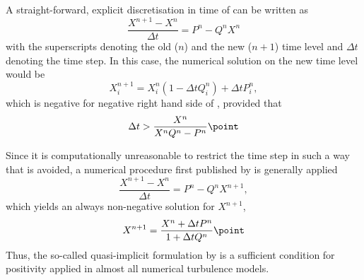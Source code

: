 A straight-forward, explicit discretisation in time of 
can be written as
\begin{equation}
  \label{eq:burchard12}
  \frac{X^{n+1}-X^n}{\Delta t}=P^n-Q^nX^n
\end{equation}
with the superscripts denoting the old ($n$) and the new ($n+1$) time
level and $\Delta t$ denoting the time step.  In this case, the
numerical solution on the new time level would be
\begin{equation}
  \label{eq:burchard13}
  X^{n+1}_i= X^n_i(1-\Delta tQ^n_i)+\Delta t P_i^n
  \comma
\end{equation}
which is negative for negative right hand side of ,
provided that
\begin{equation}
  \label{eq:burchard14}
  \Delta t > \frac{X^n}{X^nQ^n-P^n}
  \point
\end{equation}

Since it is computationally unreasonable to restrict the time step in
such a way that  is avoided, a numerical procedure
first published by \cite{Patankar80} is generally applied
\begin{equation}
  \label{eq:burchard15}
  \frac{X^{n+1}-X^n}{\Delta t}=P^n-Q^nX^{n+1}
  \comma
\end{equation}
which yields an always non-negative solution for $X^{n+1}$,
\begin{equation}
  \label{eq:burchard16}
   X^{n+1}= \frac{X^n+\Delta t P^n}{1+\Delta t Q^n}
   \point
\end{equation}
Thus, the so-called quasi-implicit formulation
 by \cite{Patankar80}
is a sufficient condition for positivity applied in almost all
numerical turbulence models.

 
